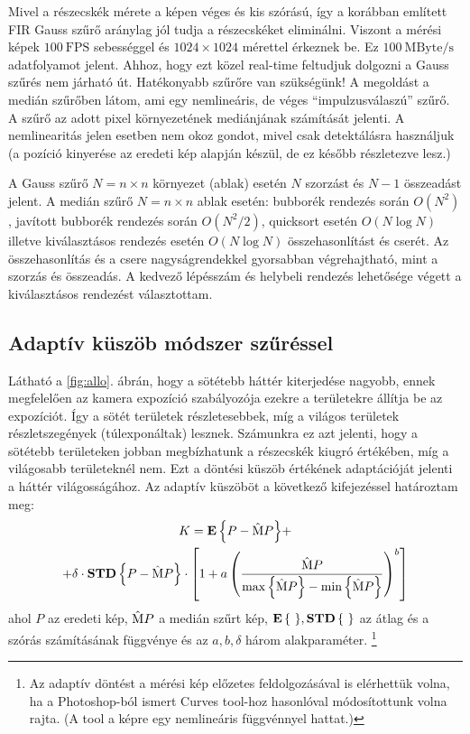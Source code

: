 	Mivel a részecskék mérete a képen véges és kis szórású, így a korábban
	említett FIR Gauss szűrő aránylag jól tudja a részecskéket eliminálni.
	Viszont a mérési képek $100\ \mathrm{FPS}$ sebességgel és $1024\times1024$ mérettel érkeznek be.
	Ez $100\ \mathrm{MByte/s}$ adatfolyamot jelent. Ahhoz, hogy ezt közel real-time feltudjuk dolgozni
	a Gauss szűrés nem járható út. Hatékonyabb szűrőre van szükségünk! A megoldást a medián szűrőben látom,
	ami egy nemlineáris, de véges ``impulzusválaszú'' szűrő.
	A szűrő az adott pixel környezetének mediánjának számítását jelenti.
	A nemlinearitás jelen esetben nem okoz gondot, mivel csak detektálásra használjuk (a pozíció
	kinyerése az eredeti kép alapján készül, de ez később részletezve lesz.)
	
	A Gauss szűrő $N = n\times n$ környezet (ablak) esetén $N$ szorzást és $N-1$ összeadást jelent. A medián szűrő $N = n\times n$
	ablak esetén: bubborék rendezés során $O(N^2)$, javított bubborék rendezés során $O(N^2 / 2)$, quicksort esetén $O(N\log N)$
	illetve kiválasztásos rendezés esetén $O(N\log N)$ összehasonlítást és cserét.
	Az összehasonlítás és a csere nagyságrendekkel gyorsabban végrehajtható, mint a szorzás és
	összeadás. A kedvező lépésszám és helybeli rendezés lehetősége végett a kiválasztásos rendezést választottam.
	
\subsection{Adaptív küszöb módszer szűréssel}
	Látható a \ref{fig:allo}. ábrán, hogy a sötétebb háttér kiterjedése nagyobb, ennek megfelelően az
	kamera expozíció szabályozója ezekre a területekre állítja be az expozíciót.
	Így a sötét területek részletesebbek, míg a világos területek részletszegények (túlexponáltak) lesznek.
	Számunkra ez azt jelenti, hogy a sötétebb területeken jobban megbízhatunk a részecskék kiugró
	értékében, míg a világosabb területeknél nem.
	Ezt a döntési küszöb értékének adaptációját jelenti a háttér világosságához.
	Az adaptív küszöböt a következő kifejezéssel határoztam meg:
	\begin{multline}
		\label{eq:treshold}
		K = {\mathop{\bf E\/}\left\{P-\mathrm{\hat{M}}P\right\}}+\\
		  + \delta \cdot {\mathop{\bf STD\/}\left\{P - \mathrm{\hat{M}}P\right\}} \cdot 
		\left[ 1+ a \left(
			\frac{\mathrm{\hat{M}}P}{\max\left\{\mathrm{\hat{M}}P\right\} - \min\left\{\mathrm{\hat{M}}P\right\}}
			\right)^b
		\right]
	\end{multline}
	ahol $P$ az eredeti kép, $\mathrm{\hat{M}} P$ a medián szűrt kép, ${\mathop{\bf E\/}\left\{\ \right\}}, {\mathop{\bf STD\/}\left\{\ \right\}}$ az
	átlag és a szórás számításának függvénye és az $a, b, \delta$ három alakparaméter.
	\footnote{Az adaptív döntést a mérési kép előzetes feldolgozásával is elérhettük volna,
	ha a Photoshop-ból ismert Curves tool-hoz hasonlóval módosítottunk volna rajta. (A tool a képre egy nemlineáris
	függvénnyel hattat.)}
	
